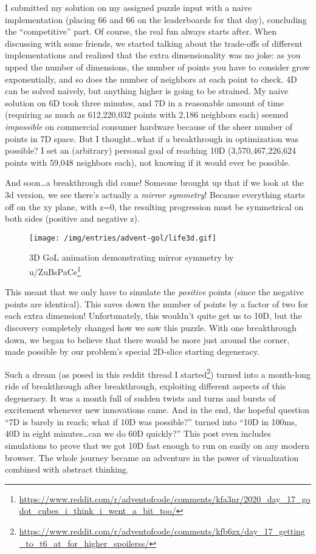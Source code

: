 \documentclass[]{article}
\renewcommand{\href}[2]{#2\footnote{\url{#1}}}
\begin{document}
I submitted my solution on my assigned puzzle input with a naive implementation
(placing 66 and 66 on the leaderboards for that day), concluding the
``competitive'' part. Of course, the real fun always starts after. When
discussing with some friends, we started talking about the trade-offs of
different implementations and realized that the extra dimensionality was no
joke: as you upped the number of dimensions, the number of points you have to
consider grow exponentially, and so does the number of neighbors at each point
to check. 4D can be solved naively, but anything higher is going to be strained.
My naive solution on 6D took three minutes, and 7D in a reasonable amount of
time (requiring as much as 612,220,032 points with 2,186 neighbors each) seemed
\emph{impossible} on commercial consumer hardware because of the sheer number of
points in 7D space. But I thought\ldots what if a breakthrough in optimization
was possible? I set an (arbitrary) personal goal of reaching 10D
(3,570,467,226,624 points with 59,048 neighbors each), not knowing if it would
ever be possible.

And soon\ldots a breakthrough did come! Someone brought up that if we look at
the 3d version, we see there's actually a \emph{mirror symmetry}! Because
everything starts off on the xy plane, with z=0, the resulting progression must
be symmetrical on both sides (positive and negative z).

\begin{figure}
\centering
\texttt{[image: /img/entries/advent-gol/life3d.gif]}
\caption{3D GoL animation demonstrating mirror symmetry by
\href{https://www.reddit.com/r/adventofcode/comments/kfa3nr/2020_day_17_godot_cubes_i_think_i_went_a_bit_too/}{u/ZuBsPaCe}}
\end{figure}

This meant that we only have to simulate the \emph{positive} points (since the
negative points are identical). This saves down the number of points by a factor
of two for each extra dimension! Unfortunately, this wouldn't quite get us to
10D, but the discovery completely changed how we saw this puzzle. With one
breakthrough down, we began to believe that there would be more just around the
corner, made possible by our problem's special 2D-slice starting degeneracy.

Such a dream (as posed in
\href{https://www.reddit.com/r/adventofcode/comments/kfb6zx/day_17_getting_to_t6_at_for_higher_spoilerss/}{this
reddit thread I started}) turned into a month-long ride of breakthrough after
breakthrough, exploiting different aspects of this degeneracy. It was a month
full of sudden twists and turns and bursts of excitement whenever new
innovations came. And in the end, the hopeful question ``7D is barely in reach;
what if 10D was possible?'' turned into ``10D in 100ms, 40D in eight
minutes\ldots can we do 60D quickly?'' This post even includes simulations to
prove that we got 10D fast enough to run on easily on any modern browser. The
whole journey became an adventure in the power of visualization combined with
abstract thinking.
\end{document}
